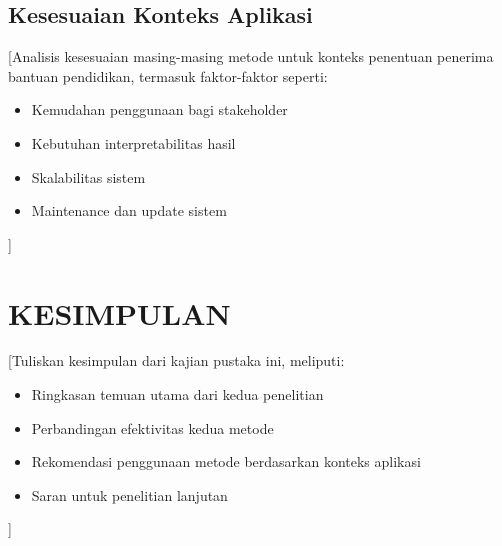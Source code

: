 \documentclass[10pt,a4paper]{article}
\begin{document}
\subsection{Kesesuaian Konteks Aplikasi}

[Analisis kesesuaian masing-masing metode untuk konteks penentuan penerima bantuan pendidikan, termasuk faktor-faktor seperti:
\begin{itemize}
    \item Kemudahan penggunaan bagi stakeholder
    \item Kebutuhan interpretabilitas hasil
    \item Skalabilitas sistem
    \item Maintenance dan update sistem
\end{itemize}]

\section{KESIMPULAN}

[Tuliskan kesimpulan dari kajian pustaka ini, meliputi:
\begin{itemize}
    \item Ringkasan temuan utama dari kedua penelitian
    \item Perbandingan efektivitas kedua metode
    \item Rekomendasi penggunaan metode berdasarkan konteks aplikasi
    \item Saran untuk penelitian lanjutan
\end{itemize}]



\end{document}

